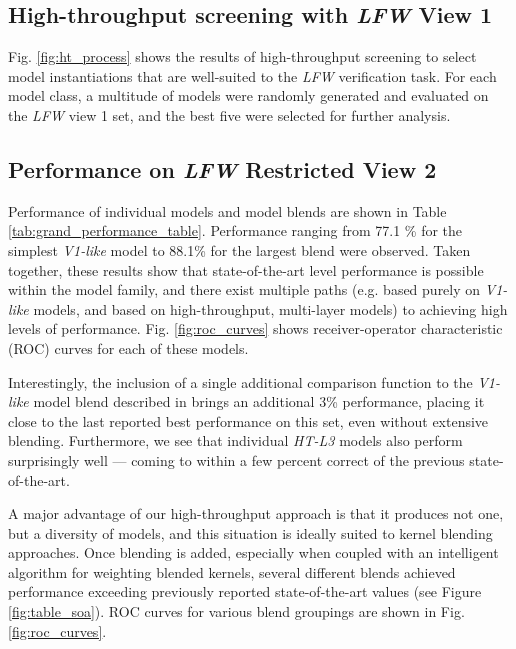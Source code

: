 


\subsection{High-throughput screening with \emph{LFW} View 1}

Fig. \ref{fig:ht_process} shows the results of high-throughput screening to select
model instantiations that are well-suited to the \emph{LFW} verification task.
For each model class, a multitude of models were randomly generated and
evaluated on the \emph{LFW} view 1 set, and the best five were selected for
further analysis.


\subsection{Performance on \emph{LFW} Restricted View 2}

Performance of individual models and model blends are shown in Table
\ref{tab:grand_performance_table}.  Performance ranging from 77.1 \% for the
simplest \emph{V1-like} model to 88.1\% for the largest blend were observed.  Taken
together, these results show that state-of-the-art level performance is possible
within the model family, and there exist multiple paths (e.g. based purely
on \emph{V1-like} models, and based on high-throughput, multi-layer models) to
achieving high levels of performance.  Fig. \ref{fig:roc_curves} shows
receiver-operator characteristic (ROC) curves for each of these models.

Interestingly, the inclusion of a single additional comparison function to the
\emph{V1-like} model blend described in \cite{pinto:cvpr09} brings an additional
3\% performance, placing it close to the last reported best performance on this
set, even without extensive blending.  Furthermore, we see that individual
\emph{HT-L3} models also perform surprisingly well --- coming to within a few percent correct of
the previous state-of-the-art.

A major advantage of our high-throughput approach is that it produces not one,
but a diversity of models, and this situation is ideally suited to kernel
blending approaches.  Once blending is added, especially when coupled with an
intelligent algorithm for weighting blended kernels, several different blends
achieved performance exceeding previously reported state-of-the-art values (see Figure \ref{fig:table_soa}).  ROC
curves for various blend groupings are shown in Fig. \ref{fig:roc_curves}.

